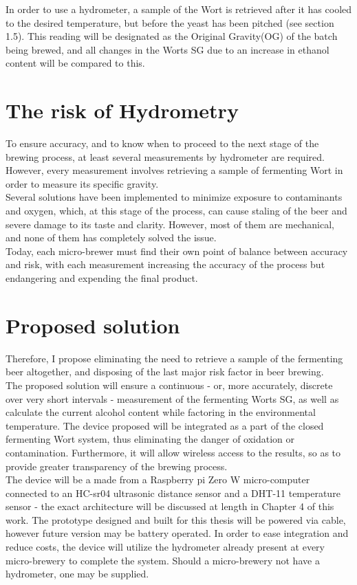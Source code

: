 \documentclass[twoside]{ctuthesis}
\theoremstyle{plain}
\theoremstyle{definition}
\theoremstyle{note}
\begin{document}
In order to use a hydrometer, a sample of the Wort is retrieved after it has cooled to the desired temperature, but before the yeast has been pitched (see section 1.5). This reading will be designated as the Original Gravity(OG) of the batch being brewed, and all changes in the Worts SG due to an increase in ethanol content will be compared to this.

\section{The risk of Hydrometry}
To ensure accuracy, and to know when to proceed to the next stage of the brewing process, at least several measurements by hydrometer are required. However, every measurement involves retrieving a sample of fermenting Wort in order to measure its specific gravity.\\
Several solutions have been implemented to minimize exposure to contaminants and oxygen, which, at this stage of the process, can cause staling of the beer and severe damage to its taste and clarity. However, most of them are mechanical, and none of them has completely solved the issue.\\
Today, each micro-brewer must find their own point of balance between accuracy and risk, with each measurement increasing the accuracy of the process but endangering and expending the final product.



\section{Proposed solution}
Therefore, I propose eliminating the need to retrieve a sample of the fermenting beer altogether, and disposing of the last major risk factor in beer brewing.\\
The proposed solution will ensure a continuous - or, more accurately, discrete over very short intervals - measurement of the fermenting Worts SG, as well as calculate the current alcohol content while factoring in the environmental temperature. The device proposed will be integrated as a part of the closed fermenting Wort system, thus eliminating the danger of oxidation or contamination. Furthermore, it will allow wireless access to the results, so as to provide greater transparency of the brewing process.\\
The device will be a made from a Raspberry pi Zero W micro-computer connected to an HC-sr04 ultrasonic distance sensor and a DHT-11 temperature sensor - the exact architecture will be discussed at length in Chapter 4 of this work. The prototype designed and built for this thesis will be powered via cable, however future version may be battery operated. In order to ease integration and reduce costs, the device will utilize the hydrometer already present at every micro-brewery to complete the system. Should a micro-brewery not have a hydrometer, one may be supplied.\\
\end{document}
